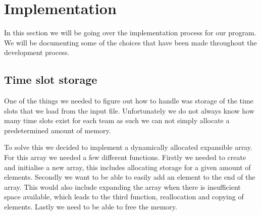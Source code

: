 \section{Implementation}
In this section we will be going over the implementation process for our program. We will be documenting some of the choices that have been made throughout the development process.

\subsection{Time slot storage}
One of the things we needed to figure out how to handle was storage of the time slots that we load from the input file. Unfortunately we do not always know how many time slots exist for each team as such we can not simply allocate a predetermined amount of memory.

To solve this we decided to implement a dynamically allocated expansible array. For this array we needed a few different functions. Firstly we needed to create and initialise a new array, this includes allocating storage for a given amount of elements. Secondly we want to be able to easily add an element to the end of the array. This would also include expanding the array when there is insufficient space available, which leads to the third function, reallocation and copying of elements. Lastly we need to be able to free the memory.

